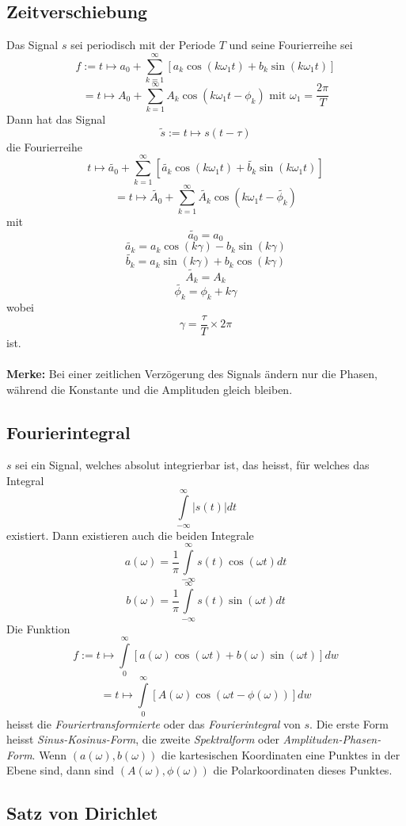 \documentclass[10pt,a4paper]{scrartcl}
\begin{document}
\subsection{Zeitverschiebung}

Das Signal $s$ sei periodisch mit der Periode $T$ und seine Fourierreihe sei
$$f:= t \mapsto a_0 + \sum_{k=1}^{\infty} \left[a_k\cos(k\omega_1t) + b_k\sin(k\omega_1t)\right]$$
$$= t \mapsto A_0 + \sum_{k=1}^{\infty} A_k \cos(k\omega_1t - \phi_k) \textrm{ mit } \omega_1 = \frac{2\pi}{T}$$
Dann hat das Signal
$$\tilde{s} := t \mapsto s(t-\tau)$$
die Fourierreihe
$$t \mapsto \widetilde{a_0} + \sum_{k=1}^{\infty} \left[\widetilde{a_k} \cos(k\omega_1t) + \widetilde{b_k}\sin(k\omega_1t)\right]$$
$$= t \mapsto \widetilde{A_0} + \sum_{k=1}^{\infty} \widetilde{A_k}\cos(k\omega_1t - \widetilde{\phi_k})$$
mit
$$\widetilde{a_0} = a_0$$
$$\widetilde{a_k} = a_k\cos(k\gamma) - b_k\sin(k\gamma)$$
$$\widetilde{b_k} = a_k\sin(k\gamma) + b_k\cos(k\gamma)$$
$$\widetilde{A_k} = A_k$$
$$\widetilde{\phi_k} = \phi_k + k\gamma$$
wobei
$$\gamma = \frac{\tau}{T} \times 2\pi$$
ist.\\\\
\textbf{Merke:} Bei einer zeitlichen Verzögerung des Signals ändern nur die Phasen,
während die Konstante und die Amplituden gleich bleiben.


\subsection{Fourierintegral}

$s$ sei ein Signal, welches absolut integrierbar ist, das heisst, für welches das Integral
$$\int\limits_{-\infty}^{\infty} |s(t)|dt$$
existiert. Dann existieren auch die beiden Integrale
$$a(\omega) = \frac{1}{\pi} \int\limits_{-\infty}^{\infty} s(t) \cos(\omega t)dt$$
$$b(\omega) = \frac{1}{\pi} \int\limits_{-\infty}^{\infty} s(t) \sin(\omega t)dt$$
Die Funktion
$$f := t \mapsto \int\limits_0^{\infty} \left[ a(\omega) \cos(\omega t) + b(\omega) \sin(\omega t)\right]dw$$
$$=t \mapsto \int\limits_0^{\infty} \left[A(\omega) \cos(\omega t - \phi (\omega))\right]dw$$
heisst die \textit{Fouriertransformierte} oder das \textit{Fourierintegral} von $s$.
Die erste Form heisst \textit{Sinus-Kosinus-Form}, die zweite \textit{Spektralform}
oder \textit{Amplituden-Phasen-Form}. Wenn $(a(\omega), b(\omega))$ die kartesischen
Koordinaten eine Punktes in der Ebene sind, dann sind $(A(\omega), \phi(\omega))$
die Polarkoordinaten dieses Punktes.


\subsection{Satz von Dirichlet}
\end{document}
